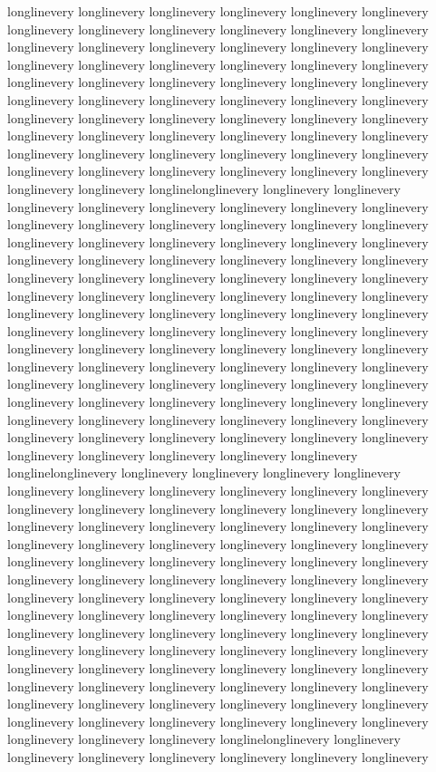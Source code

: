 {longlinevery longlinevery longlinevery longlinevery longlinevery longlinevery longlinevery longlinevery longlinevery longlinevery longlinevery longlinevery longlinevery longlinevery longlinevery longlinevery longlinevery longlinevery longlinevery longlinevery longlinevery longlinevery longlinevery longlinevery longlinevery longlinevery longlinevery longlinevery longlinevery longlinevery longlinevery longlinevery longlinevery longlinevery longlinevery longlinevery longlinevery longlinevery longlinevery longlinevery longlinevery longlinevery longlinevery longlinevery longlinevery longlinevery longlinevery longlinevery longlinevery longlinevery longlinevery longlinevery longlinevery longlinevery longlinevery longlinevery longlinevery longlinevery longlinevery longlinevery longlinevery longlinevery longlinelonglinevery longlinevery longlinevery longlinevery longlinevery longlinevery longlinevery longlinevery longlinevery longlinevery longlinevery longlinevery longlinevery longlinevery longlinevery longlinevery longlinevery longlinevery longlinevery longlinevery longlinevery longlinevery longlinevery longlinevery longlinevery longlinevery longlinevery longlinevery longlinevery longlinevery longlinevery longlinevery longlinevery longlinevery longlinevery longlinevery longlinevery longlinevery longlinevery longlinevery longlinevery longlinevery longlinevery longlinevery longlinevery longlinevery longlinevery longlinevery longlinevery longlinevery longlinevery longlinevery longlinevery longlinevery longlinevery longlinevery longlinevery longlinevery longlinevery longlinevery longlinevery longlinevery longlinevery longlinevery longlinevery longlinevery longlinevery longlinevery longlinevery longlinevery longlinevery longlinevery longlinevery longlinevery longlinevery longlinevery longlinevery longlinevery longlinevery longlinevery longlinevery longlinevery longlinevery longlinevery longlinevery longlinevery longlinevery longlinevery longlinevery longlinevery longlinevery longlinevery longlinelonglinevery longlinevery longlinevery longlinevery longlinevery longlinevery longlinevery longlinevery longlinevery longlinevery longlinevery longlinevery longlinevery longlinevery longlinevery longlinevery longlinevery longlinevery longlinevery longlinevery longlinevery longlinevery longlinevery longlinevery longlinevery longlinevery longlinevery longlinevery longlinevery longlinevery longlinevery longlinevery longlinevery longlinevery longlinevery longlinevery longlinevery longlinevery longlinevery longlinevery longlinevery longlinevery longlinevery longlinevery longlinevery longlinevery longlinevery longlinevery longlinevery longlinevery longlinevery longlinevery longlinevery longlinevery longlinevery longlinevery longlinevery longlinevery longlinevery longlinevery longlinevery longlinevery longlinevery longlinevery longlinevery longlinevery longlinevery longlinevery longlinevery longlinevery longlinevery longlinevery longlinevery longlinevery longlinevery longlinevery longlinevery longlinevery longlinevery longlinevery longlinevery longlinevery longlinevery longlinevery longlinevery longlinevery longlinevery longlinevery longlinevery longlinevery longlinevery longlinevery longlinelonglinevery longlinevery longlinevery longlinevery longlinevery longlinevery longlinevery longlinevery }
